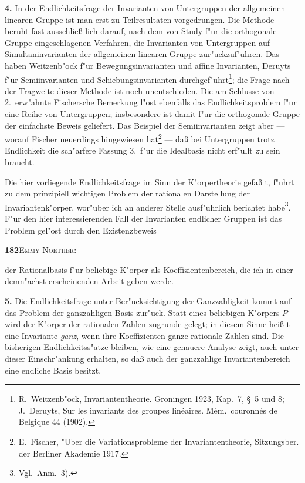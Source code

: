 \documentclass[12pt,a4paper]{article}
\begin{document}
{\textbf{4.} In der Endlichkeitsfrage der Invarianten von Untergruppen der
allgemeinen linearen Gruppe ist man erst zu Teilresultaten vorgedrungen.
Die Methode beruht fast ausschlie{\ss} lich darauf, nach dem von Study
f"{u}r die orthogonale Gruppe eingeschlagenen Verfahren, die Invarianten
von Untergruppen auf Simultaninvarianten der allgemeinen linearen
Gruppe zur"{u}ckzuf"{u}hren. Das haben Weitzenb"{o}ck f"{u}r Bewegungsinvarianten
und affine Invarianten, Deruyts f"{u}r Semiinvarianten und Schiebungsinvarianten
durchgef"{u}hrt\footnote{R.~Weitzenb"{o}ck, Invariantentheorie. Groningen 1923, Kap.~7, \S~5 und 8;
J.~Deruyts, Sur les invariants des groupes lin\'{e}aires. M\'{e}m.\ couronn\'{e}s de Belgique 44 (1902).}; die Frage nach der Tragweite dieser
Methode ist noch unentschieden. Die am Schlusse von 2.\ erw"{a}hnte
Fischersche Bemerkung l"{o}st ebenfalls das Endlichkeitsproblem f"{u}r eine
Reihe von Untergruppen; insbesondere ist damit f"{u}r die orthogonale
Gruppe der einfachste Beweis geliefert. Das Beispiel der Semiinvarianten
zeigt aber --- worauf Fischer neuerdings hingewiesen hat\footnote{E.~Fischer, "{U}ber die Variationsprobleme der Invariantentheorie, Sitzungsber.
der Berliner Akademie 1917.} --- da{\ss} bei
Untergruppen trotz Endlichkeit die sch"{a}rfere Fassung 3.\ f"{u}r die Idealbasis
nicht erf"{u}llt zu sein braucht.

Die hier vorliegende Endlichkeitsfrage im Sinn der K"{o}rpertheorie
gefa{\ss} t, f"{u}hrt zu dem prinzipiell wichtigen Problem der rationalen Darstellung
der Invariantenk"{o}rper, wor"{u}ber ich an anderer Stelle ausf"{u}hrlich
berichtet habe\footnote{Vgl.\ Anm.~3).}. F"{u}r den hier interessierenden Fall der Invarianten
endlicher Gruppen ist das Problem gel"{o}st durch den Existenzbeweis

\newpage
\begin{center}
\textbf{182}\quad\textsc{Emmy Noether:}
\end{center}

der Rationalbasis f"{u}r beliebige K"{o}rper als Koeffizientenbereich, die ich
in einer demn"{a}chst erscheinenden Arbeit geben werde.

\textbf{5.} Die Endlichkeitsfrage unter Ber"{u}cksichtigung der Ganzzahligkeit
kommt auf das Problem der ganzzahligen Basis zur"{u}ck. Statt eines
beliebigen K"{o}rpers $P$ wird der K"{o}rper der rationalen Zahlen zugrunde
gelegt; in diesem Sinne hei{\ss} t eine Invariante \textit{ganz}, wenn ihre Koeffizienten
ganze rationale Zahlen sind. Die bisherigen Endlichkeitss"{a}tze
bleiben, wie eine genauere Analyse zeigt, auch unter dieser Einschr"{a}nkung
erhalten, so da{\ss} auch der ganzzahlige Invariantenbereich eine endliche
Basis besitzt.

}
\end{document}
